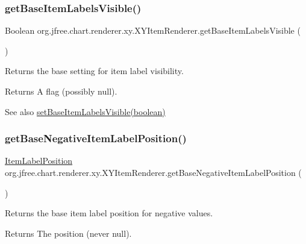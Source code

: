 \subsubsection{\texorpdfstring{get\+Base\+Item\+Labels\+Visible()}{getBaseItemLabelsVisible()}}
{\footnotesize\ttfamily Boolean org.\+jfree.\+chart.\+renderer.\+xy.\+X\+Y\+Item\+Renderer.\+get\+Base\+Item\+Labels\+Visible (\begin{DoxyParamCaption}{ }\end{DoxyParamCaption})}

Returns the base setting for item label visibility.

\begin{DoxyReturn}{Returns}
A flag (possibly {\ttfamily null}).
\end{DoxyReturn}
\begin{DoxySeeAlso}{See also}
\mbox{\hyperlink{interfaceorg_1_1jfree_1_1chart_1_1renderer_1_1xy_1_1_x_y_item_renderer_ac684655063a646d75697136fd62a65aa}{set\+Base\+Item\+Labels\+Visible(boolean)}} 
\end{DoxySeeAlso}
\mbox{\label{interfaceorg_1_1jfree_1_1chart_1_1renderer_1_1xy_1_1_x_y_item_renderer_aad96a9a12582675875421455a6177239}} 
\subsubsection{\texorpdfstring{get\+Base\+Negative\+Item\+Label\+Position()}{getBaseNegativeItemLabelPosition()}}
{\footnotesize\ttfamily \mbox{\hyperlink{classorg_1_1jfree_1_1chart_1_1labels_1_1_item_label_position}{Item\+Label\+Position}} org.\+jfree.\+chart.\+renderer.\+xy.\+X\+Y\+Item\+Renderer.\+get\+Base\+Negative\+Item\+Label\+Position (\begin{DoxyParamCaption}{ }\end{DoxyParamCaption})}

Returns the base item label position for negative values.

\begin{DoxyReturn}{Returns}
The position (never {\ttfamily null}). 
\end{DoxyReturn}
\mbox{\label{interfaceorg_1_1jfree_1_1chart_1_1renderer_1_1xy_1_1_x_y_item_renderer_a3b0b7659139c245b83ce5436885c1bde}} 
